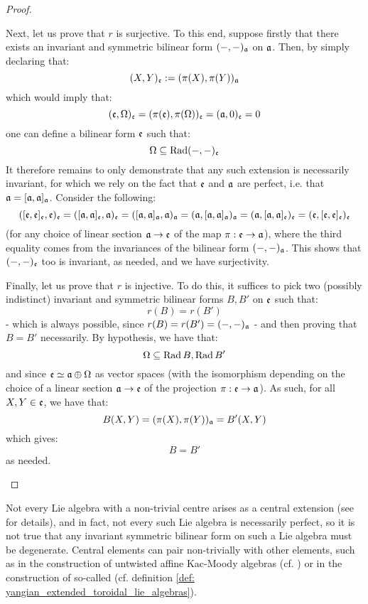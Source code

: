 \begin{proof}
\begin{enumerate}
                    Next, let us prove that $r$ is surjective. To this end, suppose firstly that there exists an invariant and symmetric bilinear form $(-, -)_{\mathfrak{a}}$ on $\mathfrak{a}$. Then, by simply declaring that:
                        $$(X, Y)_{\mathfrak{e}} := (\pi(X), \pi(Y))_{\mathfrak{a}}$$
                    which would imply that:
                        $$(\mathfrak{e}, \Omega)_{\mathfrak{e}} = (\pi(\mathfrak{e}), \pi(\Omega))_{\mathfrak{e}} = (\mathfrak{a}, 0)_{\mathfrak{e}} = 0$$
                    one can define a bilinear form $\mathfrak{e}$ such that:
                        $$\Omega \subseteq \operatorname{Rad}(-, -)_{\mathfrak{e}}$$
                    It therefore remains to only demonstrate that any such extension is necessarily invariant, for which we rely on the fact that $\mathfrak{e}$ and $\mathfrak{a}$ are perfect, i.e. that $\mathfrak{a} = [\mathfrak{a}, \mathfrak{a}]_{\mathfrak{a}}$. Consider the following:
                        $$( [\mathfrak{e}, \mathfrak{e}]_{\mathfrak{e}}, \mathfrak{e} )_{\mathfrak{e}} = ( [\mathfrak{a}, \mathfrak{a}]_{\mathfrak{e}}, \mathfrak{a} )_{\mathfrak{e}} = ( [\mathfrak{a}, \mathfrak{a}]_{\mathfrak{a}}, \mathfrak{a} )_{\mathfrak{a}} = ( \mathfrak{a}, [\mathfrak{a}, \mathfrak{a}]_{\mathfrak{a}} )_{\mathfrak{a}} = ( \mathfrak{a}, [\mathfrak{a}, \mathfrak{a}]_{\mathfrak{e}} )_{\mathfrak{e}} = ( \mathfrak{e}, [\mathfrak{e}, \mathfrak{e}]_{\mathfrak{e}} )_{\mathfrak{e}}$$
                    (for any choice of linear section $\mathfrak{a} \to \mathfrak{e}$ of the map $\pi: \mathfrak{e} \to \mathfrak{a}$), where the third equality comes from the invariances of the bilinear form $(-, -)_{\mathfrak{a}}$. This shows that $(-, -)_{\mathfrak{e}}$ too is invariant, as needed, and we have surjectivity.
    
                    Finally, let us prove that $r$ is injective. To do this, it suffices to pick two (possibly indistinct) invariant and symmetric bilinear forms $B, B'$ on $\mathfrak{e}$ such that:
                        $$r(B) = r(B')$$
                    - which is always possible, since $r(B) = r(B') = (-, -)_{\mathfrak{a}}$ - and then proving that $B = B'$ necessarily. By hypothesis, we have that:
                        $$\Omega \subseteq \operatorname{Rad} B, \operatorname{Rad} B'$$
                    and since $\mathfrak{e} \simeq \mathfrak{a} \oplus \Omega$ as vector spaces (with the isomorphism depending on the choice of a linear section $\mathfrak{a} \to \mathfrak{e}$ of the projection $\pi: \mathfrak{e} \to \mathfrak{a}$). As such, for all $X, Y \in \mathfrak{e}$, we have that:
                        $$B(X, Y) = (\pi(X), \pi(Y))_{\mathfrak{a}} = B'(X, Y)$$
                    which gives:
                        $$B = B'$$
                    as needed.
                \end{enumerate}
            \end{proof}
        \begin{remark}
            Not every Lie algebra with a non-trivial centre arises as a central extension (see \cite[Section 1]{garland_arithmetics_of_loop_groups} for details), and in fact, not every such Lie algebra is necessarily perfect, so it is not true that any invariant symmetric bilinear form on such a Lie algebra must be degenerate. Central elements can pair non-trivially with other elements, such as in the construction of untwisted affine Kac-Moody algebras (cf. \cite[Chapter 7]{kac_infinite_dimensional_lie_algebras}) or in the construction of so-called  (cf. definition \ref{def: yangian_extended_toroidal_lie_algebras}).
        \end{remark}